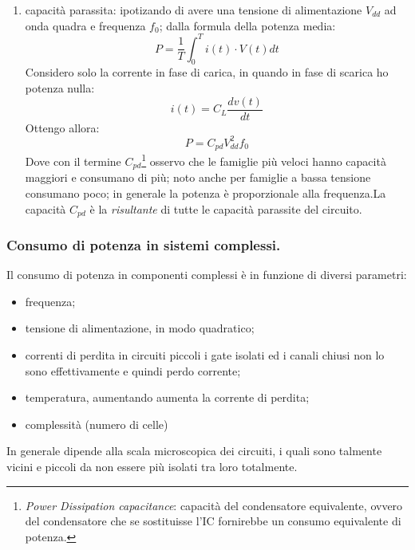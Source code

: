 \documentclass[
]{book}
\providecommand{\tightlist}{%
  \setlength{\itemsep}{0pt}\setlength{\parskip}{0pt}}
\begin{document}
\begin{itemize}
\begin{itemize}
    \begin{enumerate}
    \def\labelenumi{\Alph{enumi})}
    \setcounter{enumi}{1}
    \tightlist
    \item
      capacità parassita: ipotizando di avere una tensione di
      alimentazione \(V_{dd}\) ad onda quadra e frequenza \(f_0\); dalla
      formula della potenza media: \[
        P=\frac{1}{T}\int_{0}^{T}i(t)\cdot V(t)dt
        \] Considero solo la corrente in fase di carica, in quando in
      fase di scarica ho potenza nulla: \[
        i(t)=C_{L}\frac{dv(t)}{dt}
        \] Ottengo allora: \[
        P=C_{pd}V_{dd}^{2}f_0
        \] Dove con il termine \(C_{pd}\)\footnote{\emph{Power
        Dissipation capacitance}: capacità del condensatore equivalente,
        ovvero del condensatore che se sostituisse l'IC fornirebbe un
        consumo equivalente di potenza.} osservo che le famiglie più
      veloci hanno capacità maggiori e consumano di più; noto anche per
      famiglie a bassa tensione consumano poco; in generale la potenza è
      proporzionale alla frequenza.\newline La capacità \(C_{pd}\) è la
      \emph{risultante} di tutte le capacità parassite del circuito.
    \end{enumerate}
  \end{itemize}
\end{itemize}

\subsubsection{Consumo di potenza in sistemi
complessi.}\label{consumo-di-potenza-in-sistemi-complessi.}

Il consumo di potenza in componenti complessi è in funzione di diversi
parametri:

\begin{itemize}
\tightlist
\item
  frequenza;
\item
  tensione di alimentazione, in modo quadratico;
\item
  correnti di perdita in circuiti piccoli i gate isolati ed i canali
  chiusi non lo sono effettivamente e quindi perdo corrente;
\item
  temperatura, aumentando aumenta la corrente di perdita;
\item
  complessità (numero di celle)
\end{itemize}

In generale dipende alla scala microscopica dei circuiti, i quali sono
talmente vicini e piccoli da non essere più isolati tra loro totalmente.
\end{document}
